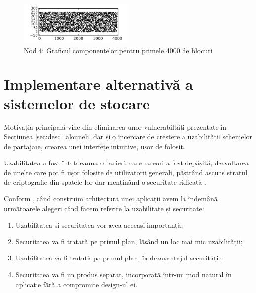 \documentclass[oneside, 12pt]{book}
\begin{document}
\begin{figure}[t]
\begin{center}
\includegraphics[width=0.5\textwidth]{img/carouri_db4_c.png}    %
\caption{Nod 4: Graficul componentelor pentru primele 4000 de blocuri} 
\label{fig:carouri_db4_c}
\end{center}
\end{figure}





\chapter{Implementare alternativă a sistemelor de stocare}
\label{cha:alternave-implementations}


Motivația principală vine din eliminarea unor vulnerabiltăți prezentate în Secțiunea  \ref{sec:desc_alouneh} dar și o încercare de creștere a uzabilității schemelor de partajare, crearea unei interfețe intuitive, ușor de folosit.

Uzabilitatea a fost întotdeauna o barieră care rareori a fost depășită; dezvoltarea de unelte care pot fi ușor folosite de utilizatorii generali, păstrând ascuns stratul de criptografie din spatele lor dar menținând o securitate ridicată \cite{gutmann:2005security}.

Conform \cite{gutmann:2005security}, când construim arhitectura unei aplicații avem la îndemână următoarele alegeri când facem referire la uzabilitate și securitate:

\begin{enumerate}
\item Uzabilitatea și securitatea vor avea aceeași importanță; 
\item Securitatea va fi tratată pe primul plan, lăsând un loc mai mic uzabilității;
\item Uzabilitatea va fi tratată pe primul plan, în dezavantajul securității;
\item Securitatea va fi un produs separat, incorporată într-un mod natural în aplicație fără a compromite design-ul ei.
\end{enumerate}
\end{document}
